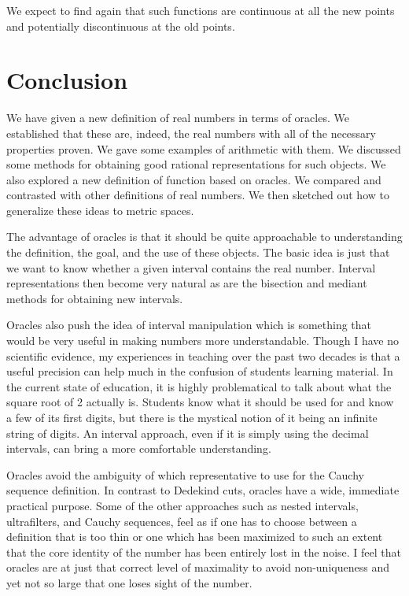 \documentclass[12pt]{article}
\theoremstyle{remark}
\begin{document}
We expect to find again that such functions are continuous at all the new points and potentially discontinuous at the old points. 

\section{Conclusion}

We have given a new definition of real numbers in terms of oracles. We established that these are, indeed, the real numbers with all of the necessary properties proven. We gave some examples of arithmetic with them. We discussed some methods for obtaining good rational representations for such objects. We also explored a new definition of function based on oracles. We compared and contrasted with other definitions of real numbers. We then sketched out how to generalize these ideas to metric spaces. 

The advantage of oracles is that it should be quite approachable to understanding the definition, the goal, and the use of these objects. The basic idea is just that we want to know whether a given interval contains the real number. Interval representations then become very natural as are the bisection and mediant methods for obtaining new intervals. 

Oracles also push the idea of interval manipulation which is something that would be very useful in making numbers more understandable. Though I have no scientific evidence, my experiences in teaching over the past two decades is that a useful precision can help much in the confusion of students learning material. In the current state of education, it is highly problematical to talk about what the square root of 2 actually is. Students know what it should be used for and know a few of its first digits, but there is the mystical notion of it being an infinite string of digits. An interval approach, even if it is simply using the decimal intervals, can bring a more comfortable understanding. 

Oracles avoid the ambiguity of which representative to use for the Cauchy sequence definition. In contrast to Dedekind cuts, oracles have a wide, immediate practical purpose. Some of the other approaches such as nested intervals, ultrafilters, and Cauchy sequences, feel as if one has to choose between a definition that is too thin or one which has been maximized to such an extent that the core identity of the number has been entirely lost in the noise. I feel that oracles are at just that correct level of maximality to avoid non-uniqueness and yet not so large that one loses sight of the number. 
\end{document}
